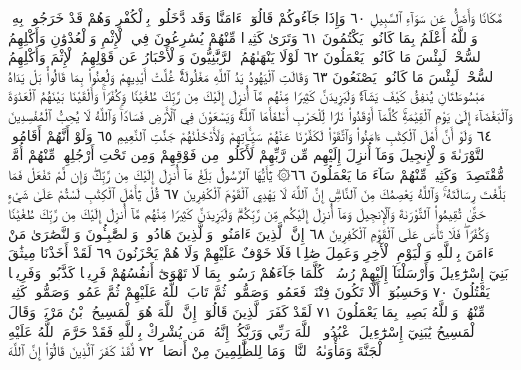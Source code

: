 مَّكَانࣰا وَأَضَلُّ عَن سَوَآءِ ٱلسَّبِيلِ ٦٠ وَإِذَا جَآءُوكُمْ قَالُوٓا۟ ءَامَنَّا وَقَد
دَّخَلُوا۟ بِٱلْكُفْرِ وَهُمْ قَدْ خَرَجُوا۟ بِهِۦۚ وَٱللَّهُ أَعْلَمُ بِمَا كَانُوا۟ يَكْتُمُونَ ٦١
وَتَرَىٰ كَثِيرࣰا مِّنْهُمْ يُسَٰرِعُونَ فِي ٱلْإِثْمِ وَٱلْعُدْوَٰنِ وَأَكْلِهِمُ
ٱلسُّحْتَۚ لَبِئْسَ مَا كَانُوا۟ يَعْمَلُونَ ٦٢ لَوْلَا يَنْهَىٰهُمُ ٱلرَّبَّٰنِيُّونَ
وَٱلْأَحْبَارُ عَن قَوْلِهِمُ ٱلْإِثْمَ وَأَكْلِهِمُ ٱلسُّحْتَۚ لَبِئْسَ مَا كَانُوا۟
يَصْنَعُونَ ٦٣ وَقَالَتِ ٱلْيَهُودُ يَدُ ٱللَّهِ مَغْلُولَةٌۚ غُلَّتْ أَيْدِيهِمْ وَلُعِنُوا۟
بِمَا قَالُوا۟ۘ بَلْ يَدَاهُ مَبْسُوطَتَانِ يُنفِقُ كَيْفَ يَشَآءُۚ وَلَيَزِيدَنَّ كَثِيرࣰا
مِّنْهُم مَّآ أُنزِلَ إِلَيْكَ مِن رَّبِّكَ طُغْيَٰنࣰا وَكُفْرࣰاۚ وَأَلْقَيْنَا بَيْنَهُمُ ٱلْعَدَٰوَةَ
وَٱلْبَغْضَآءَ إِلَىٰ يَوْمِ ٱلْقِيَٰمَةِۚ كُلَّمَآ أَوْقَدُوا۟ نَارࣰا لِّلْحَرْبِ أَطْفَأَهَا
ٱللَّهُۚ وَيَسْعَوْنَ فِي ٱلْأَرْضِ فَسَادࣰاۚ وَٱللَّهُ لَا يُحِبُّ ٱلْمُفْسِدِينَ ٦٤
وَلَوْ أَنَّ أَهْلَ ٱلْكِتَٰبِ ءَامَنُوا۟ وَٱتَّقَوْا۟ لَكَفَّرْنَا عَنْهُمْ
سَيِّـَٔاتِهِمْ وَلَأَدْخَلْنَٰهُمْ جَنَّٰتِ ٱلنَّعِيمِ ٦٥ وَلَوْ أَنَّهُمْ أَقَامُوا۟
ٱلتَّوْرَىٰةَ وَٱلْإِنجِيلَ وَمَآ أُنزِلَ إِلَيْهِم مِّن رَّبِّهِمْ لَأَكَلُوا۟
مِن فَوْقِهِمْ وَمِن تَحْتِ أَرْجُلِهِمۚ مِّنْهُمْ أُمَّةࣱ مُّقْتَصِدَةࣱۖ
وَكَثِيرࣱ مِّنْهُمْ سَآءَ مَا يَعْمَلُونَ ٦٦۞ يَٰٓأَيُّهَا ٱلرَّسُولُ
بَلِّغْ مَآ أُنزِلَ إِلَيْكَ مِن رَّبِّكَۖ وَإِن لَّمْ تَفْعَلْ فَمَا بَلَّغْتَ
رِسَالَتَهُۥۚ وَٱللَّهُ يَعْصِمُكَ مِنَ ٱلنَّاسِۗ إِنَّ ٱللَّهَ لَا يَهْدِي ٱلْقَوْمَ
ٱلْكَٰفِرِينَ ٦٧ قُلْ يَٰٓأَهْلَ ٱلْكِتَٰبِ لَسْتُمْ عَلَىٰ شَيْءٍ حَتَّىٰ
تُقِيمُوا۟ ٱلتَّوْرَىٰةَ وَٱلْإِنجِيلَ وَمَآ أُنزِلَ إِلَيْكُم مِّن رَّبِّكُمْۗ
وَلَيَزِيدَنَّ كَثِيرࣰا مِّنْهُم مَّآ أُنزِلَ إِلَيْكَ مِن رَّبِّكَ طُغْيَٰنࣰا وَكُفْرࣰاۖ
فَلَا تَأْسَ عَلَى ٱلْقَوْمِ ٱلْكَٰفِرِينَ ٦٨ إِنَّ ٱلَّذِينَ ءَامَنُوا۟ وَٱلَّذِينَ
هَادُوا۟ وَٱلصَّٰبِـُٔونَ وَٱلنَّصَٰرَىٰ مَنْ ءَامَنَ بِٱللَّهِ وَٱلْيَوْمِ ٱلْأٓخِرِ
وَعَمِلَ صَٰلِحࣰا فَلَا خَوْفٌ عَلَيْهِمْ وَلَا هُمْ يَحْزَنُونَ ٦٩ لَقَدْ أَخَذْنَا
مِيثَٰقَ بَنِيٓ إِسْرَٰٓءِيلَ وَأَرْسَلْنَآ إِلَيْهِمْ رُسُلࣰاۖ كُلَّمَا جَآءَهُمْ رَسُولُۢ
بِمَا لَا تَهْوَىٰٓ أَنفُسُهُمْ فَرِيقࣰا كَذَّبُوا۟ وَفَرِيقࣰا يَقْتُلُونَ ٧٠
وَحَسِبُوٓا۟ أَلَّا تَكُونَ فِتْنَةࣱ فَعَمُوا۟ وَصَمُّوا۟ ثُمَّ تَابَ ٱللَّهُ عَلَيْهِمْ ثُمَّ
عَمُوا۟ وَصَمُّوا۟ كَثِيرࣱ مِّنْهُمْۚ وَٱللَّهُ بَصِيرُۢ بِمَا يَعْمَلُونَ ٧١
لَقَدْ كَفَرَ ٱلَّذِينَ قَالُوٓا۟ إِنَّ ٱللَّهَ هُوَ ٱلْمَسِيحُ ٱبْنُ مَرْيَمَۖ وَقَالَ ٱلْمَسِيحُ
يَٰبَنِيٓ إِسْرَٰٓءِيلَ ٱعْبُدُوا۟ ٱللَّهَ رَبِّي وَرَبَّكُمْۖ إِنَّهُۥ مَن يُشْرِكْ
بِٱللَّهِ فَقَدْ حَرَّمَ ٱللَّهُ عَلَيْهِ ٱلْجَنَّةَ وَمَأْوَىٰهُ ٱلنَّارُۖ وَمَا
لِلظَّٰلِمِينَ مِنْ أَنصَارࣲ ٧٢ لَّقَدْ كَفَرَ ٱلَّذِينَ قَالُوٓا۟ إِنَّ ٱللَّهَ
